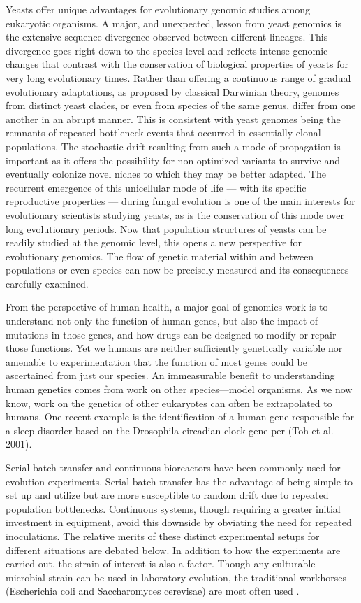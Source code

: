 \cite{dujon2010yeast}
Yeasts offer unique advantages for evolutionary genomic studies among eukaryotic organisms. A major, and unexpected, lesson from yeast genomics is the extensive sequence divergence observed between different lineages. This divergence goes right down to the species level and reflects intense genomic changes that contrast with the conservation of biological properties of yeasts for very long evolutionary times. Rather than offering a continuous range of gradual evolutionary adaptations, as proposed by classical Darwinian theory, genomes from distinct yeast clades, or even from species of the same genus, differ from one another in an abrupt manner. This is consistent with yeast genomes being the remnants of repeated bottleneck events that occurred in essentially clonal populations. The stochastic drift resulting from such a mode of propagation is important as it offers the possibility for non-optimized variants to survive and eventually colonize novel niches to which they may be better adapted. The recurrent emergence of this unicellular mode of life — with its specific reproductive properties — during fungal evolution is one of the main interests for evolutionary scientists studying yeasts, as is the conservation of this mode over long evolutionary periods. Now that population structures of yeasts can be readily studied at the genomic level, this opens a new perspective for evolutionary genomics. The flow of genetic material within and between populations or even species can now be precisely measured and its consequences carefully examined.




From the perspective of human health, a major goal of genomics work is to understand not only the function of human genes, but also the impact of mutations in those genes, and how drugs can be designed to modify or repair those functions. Yet we humans are neither sufficiently genetically variable nor amenable to experimentation that the function of most genes could be ascertained from just our species. An immeasurable benefit to understanding human genetics comes from work on other species—model organisms. As we now know, work on the genetics of other eukaryotes can often be extrapolated to humans. One recent example is the identification of a human gene responsible for a sleep disorder based on the Drosophila circadian clock gene per (Toh et al. 2001).




Serial batch transfer and continuous bioreactors have been commonly used for evolution experiments. Serial batch transfer has the advantage of being simple to set up and utilize but are more susceptible to random drift due to repeated population bottlenecks. Continuous systems, though requiring a greater initial investment in equipment, avoid this downside by obviating the need for repeated inoculations. The relative merits of these distinct experimental setups for different situations are debated below. In addition to how the experiments are carried out, the strain of interest is also a factor. Though any culturable microbial strain can be used in laboratory evolution, the traditional workhorses (Escherichia coli and Saccharomyces cerevisae) are most often used .
